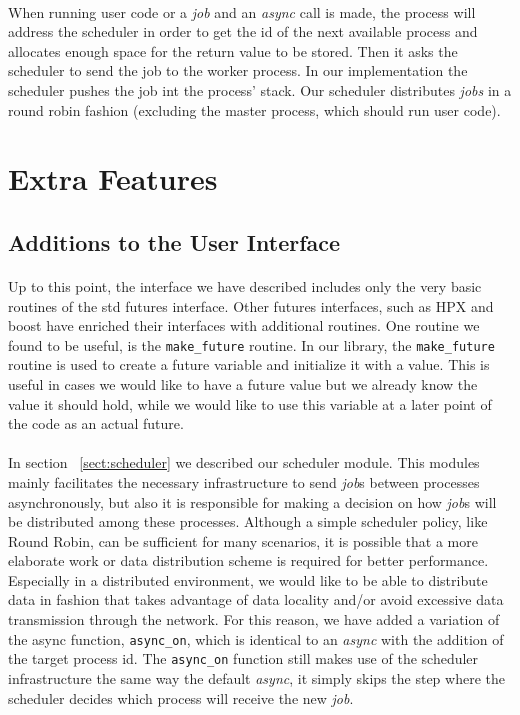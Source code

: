 \paragraph{}
When running user code or a \emph{job} and an \emph{async} call is made, the process will address the scheduler in order
to get the id of the next available process and allocates enough space for the return value to be stored.
Then it asks the scheduler to send the job to the worker process.  In our implementation the scheduler 
pushes the job int the process' stack.  Our scheduler distributes \emph{jobs} in a round robin fashion 
(excluding the master process, which should run user code). 

\section{Extra Features}
\label{sect:extra_features}

\subsection{Additions to the User Interface}
\paragraph{}
Up to this point, the interface we have described includes only the very basic routines of the std futures interface.
Other futures interfaces, such as HPX and boost have enriched their interfaces with additional routines.  One routine
we found to be useful, is the \texttt{make\_future} routine.  In our library, the \texttt{make\_future} routine is used
to create a future variable and initialize it with a value.  This is useful in cases we would like to have a future
value but we already know the value it should hold, while we would like to use this variable at a later point of the code
as an actual future.

\paragraph{}
In section ~\ref{sect:scheduler} we described our scheduler module.  This modules mainly facilitates the necessary 
infrastructure to send \emph{job}s between processes asynchronously, but also it is responsible for making a decision
on how \emph{job}s will be distributed among these processes.  Although a simple scheduler policy, like Round Robin, 
can be sufficient for many scenarios, it is possible that a more elaborate work or data distribution scheme is required
for better performance.  Especially in a distributed environment, we would like to be able to distribute data in fashion
that takes advantage of data locality and/or avoid excessive data transmission through the network.  For this reason, we
have added a variation of the async function, \texttt{async\_on}, which is identical to an \emph{async} with the addition of
the target process id.  The \texttt{async\_on} function still makes use of the scheduler infrastructure the same way
the default \emph{async}, it simply skips the step where the scheduler decides which process will receive the new 
\emph{job}.


